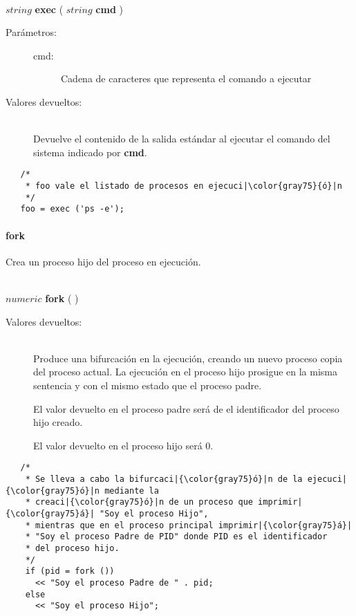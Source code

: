 \begin{framed}
\hfill \\ $string$ \textbf{exec} ( $string$ \textbf{cmd} )  
\begin{description}
\item [Parámetros:] \hfill 
   \begin{description}
   \item[cmd:] Cadena de caracteres que representa el comando a ejecutar
   \end{description}
\item[Valores devueltos:] \hfill \\
   Devuelve el contenido de la salida estándar al ejecutar el comando del sistema indicado por \textbf{cmd}.
\end{description}
\end{framed}
     
\begin{lstlisting}   
   /*
    * foo vale el listado de procesos en ejecuci|\color{gray75}{ó}|n
    */
   foo = exec ('ps -e');
\end{lstlisting}

\paragraph{fork}
Crea un proceso hijo del proceso en ejecución.


\begin{framed}
\hfill \\ $numeric$ \textbf{fork} ( )  
\begin{description}
\item[Valores devueltos:] \hfill \\
   Produce una bifurcación en la ejecución, creando un nuevo proceso copia del 
   proceso actual. La ejecución en el proceso hijo prosigue en la misma sentencia 
   y con el mismo estado que el proceso padre. 
   
   El valor devuelto en el proceso padre será de el identificador del proceso hijo creado. 
   
   El valor devuelto en el proceso hijo será $0$.
\end{description}
\end{framed}
     
\begin{lstlisting}   
   /*
    * Se lleva a cabo la bifurcaci|{\color{gray75}ó}|n de la ejecuci|{\color{gray75}ó}|n mediante la 
    * creaci|{\color{gray75}ó}|n de un proceso que imprimir|{\color{gray75}á}| "Soy el proceso Hijo",
    * mientras que en el proceso principal imprimir|{\color{gray75}á}| 
    * "Soy el proceso Padre de PID" donde PID es el identificador
    * del proceso hijo.
    */
    if (pid = fork ()) 
      << "Soy el proceso Padre de " . pid;
    else
      << "Soy el proceso Hijo";
\end{lstlisting}

